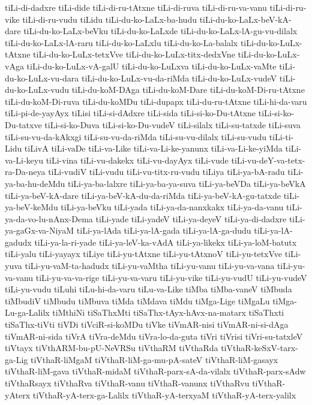 {tiLi-di-dadxre
tiLi-dide
tiLi-di-ru-tAtxne
tiLi-di-ruva
tiLi-di-ru-va-vanu
tiLi-di-ru-vike
tiLi-di-ru-vudu
tiLidu
tiLi-du-ko-LaLx-ba-hudu
tiLi-du-ko-LaLx-beV-kA-dare
tiLi-du-ko-LaLx-beVku
tiLi-du-ko-LaLxde
tiLi-du-ko-LaLx-lA-gu-vu-dilalx
tiLi-du-ko-LaLx-lA-raru
tiLi-du-ko-LaLxlu
tiLi-du-ko-La-balalx
tiLi-du-ko-LuLx-tAtxne
tiLi-du-ko-LuLx-tetxVve
tiLi-du-ko-LuLx-titx-dedxVne
tiLi-du-ko-LuLx-vAga
tiLi-du-ko-LuLx-vA-galU
tiLi-du-ko-LuLxva
tiLi-du-ko-LuLx-vaMte
tiLi-du-ko-LuLx-vu-dara
tiLi-du-ko-LuLx-vu-da-riMda
tiLi-du-ko-LuLx-vudeV
tiLi-du-ko-LuLx-vudu
tiLi-du-koM-DAga
tiLi-du-koM-Dare
tiLi-du-koM-Di-ru-tAtxne
tiLi-du-koM-Di-ruva
tiLi-du-koMDu
tiLi-dupapx
tiLi-du-ru-tAtxne
tiLi-hi-da-varu
tiLi-pi-de-yayAyx
tiLisi
tiLi-si-dAdxre
tiLi-sida
tiLi-si-ko-Du-tAtxne
tiLi-si-ko-Du-tatxve
tiLi-si-ko-Duva
tiLi-si-ko-Du-vudeV
tiLi-silalx
tiLi-su-tatxde
tiLi-suva
tiLi-su-vu-da-kAkxgi
tiLi-su-vu-da-riMda
tiLi-su-vu-dilalx
tiLi-su-vudu
tiLi-ti-Lidu
tiLivA
tiLi-vaDe
tiLi-va-Like
tiLi-va-Li-ke-yanunx
tiLi-va-Li-ke-yiMda
tiLi-va-Li-keyu
tiLi-vina
tiLi-vu-dakekx
tiLi-vu-dayAyx
tiLi-vude
tiLi-vu-deY-va-tetx-ra-Da-neya
tiLi-vudiV
tiLi-vudu
tiLi-vu-titx-ru-vudu
tiLiya
tiLi-ya-bA-radu
tiLi-ya-ba-hu-deMdu
tiLi-ya-ba-lalxre
tiLi-ya-ba-ya-suva
tiLi-ya-beVDa
tiLi-ya-beVkA
tiLi-ya-beV-kA-dare
tiLi-ya-beV-kA-du-da-riMda
tiLi-ya-beV-kA-gu-tatxde
tiLi-ya-beV-keMdu
tiLi-ya-beVku
tiLi-yada
tiLi-ya-da-nanxkakx
tiLi-ya-da-vanu
tiLi-ya-da-vo-lu-nAnx-Dema
tiLi-yade
tiLi-yadeV
tiLi-ya-deyeV
tiLi-ya-di-dadxre
tiLi-ya-gaGx-va-NiyaM
tiLi-ya-lAda
tiLi-ya-lA-gada
tiLi-ya-lA-ga-dudu
tiLi-ya-lA-gadudx
tiLi-ya-la-ri-yade
tiLi-ya-leV-ka-vAdA
tiLi-ya-likekx
tiLi-ya-loM-batutx
tiLi-yalu
tiLi-yayayx
tiLiye
tiLi-yu-tAtxne
tiLi-yu-tAtxnoV
tiLi-yu-tetxVve
tiLi-yuva
tiLi-yu-vaM-ta-hadudx
tiLi-yu-vaMtha
tiLi-yu-vanu
tiLi-yu-va-vana
tiLi-yu-va-vanu
tiLi-yu-va-va-rige
tiLi-yu-va-varu
tiLi-yu-vike
tiLi-yu-vudU
tiLi-yu-vudeV
tiLi-yu-vudu
tiLuhi
tiLu-hi-da-varu
tiLu-va-Like
tiMba
tiMba-vaneV
tiMbuda
tiMbudiV
tiMbudu
tiMbuva
tiMda
tiMdava
tiMdu
tiMga-Lige
tiMgaLu
tiMga-Lu-ga-Lalilx
tiMthiNi
tiSaThxMti
tiSaThx-tAyx-hAvx-na-matarx
tiSaThxti
tiSaThx-tiVti
tiVDi
tiVciR-si-koMDu
tiVke
tiVmAR-nisi
tiVmAR-ni-si-dAga
tiVmAR-ni-sida
tiVrA
tiVra-deMdu
tiVra-lo-da-guta
tiVri
tiVrisi
tiVri-su-tatxleV
tiVtayx
tiVthARM-bu-pU-NeVRSu
tiVthaRM
tiVthaRda
tiVthaR-keSxV-tarx-ga-Lig
tiVthaR-liMgaM
tiVthaR-liM-ga-mu-pA-sateV
tiVthaR-liM-gasayx
tiVthaR-liM-gava
tiVthaR-midaM
tiVthaR-parx-sA-da-vilalx
tiVthaR-parx-sAdw
tiVthaRsayx
tiVthaRva
tiVthaR-vanu
tiVthaR-vanunx
tiVthaRvu
tiVthaR-yAterx
tiVthaR-yA-terx-ga-Lalilx
tiVthaR-yA-terxyaM
tiVthaR-yA-terx-yalilx
}
